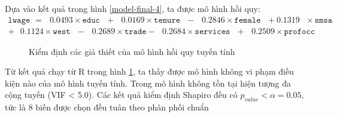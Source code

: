 Dựa vào kết quả trong hình \ref{model-final-4}, ta được mô hình hồi quy:
\begin{equation*}
\begin{multlined}
	\texttt{lwage } = \text{ } 0.0493\times \texttt{educ} \text{ } + \text{ } 0.0169 \times \texttt{tenure} \text{ }-\text{ }0.2846 \times \texttt{female} \text{ } + 0.1319 \text{ } \times \texttt{smsa} \text{ } \\
	+\text{ }0.1124 \times\texttt{west}\text{ } -\text{ }0.2689\times \texttt{trade} -\text{ }0.2684 \times \texttt{services} \text{ } + \text{ }0.2509\times \texttt{profocc}
\end{multlined}
\end{equation*}



\begin{figure}[H]
	\centering
	\hfill
	\label{test-model}
	\caption{Kiểm định các giả thiết của mô hình hồi quy tuyến tính}
\end{figure}


Từ kết quả chạy từ R trong hình \ref{test-model}, ta thấy được mô hình không vi phạm điều kiện nào của mô hình tuyến tính. Trong mô hình không tồn tại hiện tượng đa cộng tuyến (VIF < 5.0). Các kết quả kiểm định Shapiro đều có $p_{value} < \alpha = 0.05$, tức là 8 biến được chọn đều tuân theo phân phối chuẩn

